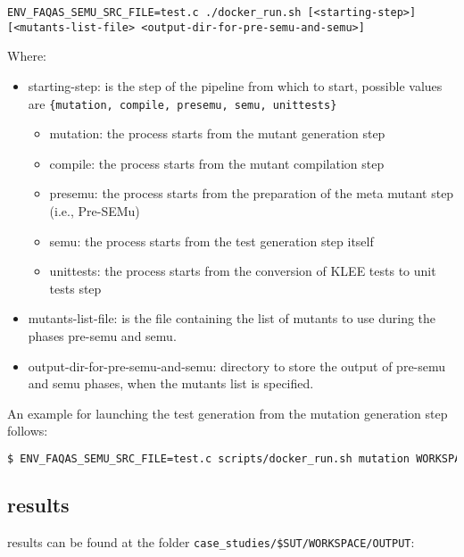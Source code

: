 \begin{lstlisting}[language={}, label=listing:semus_launch]
ENV_FAQAS_SEMU_SRC_FILE=test.c ./docker_run.sh [<starting-step>] [<mutants-list-file> <output-dir-for-pre-semu-and-semu>]
\end{lstlisting}

Where:
\begin{itemize}
	\item starting-step: is the step of the pipeline from which to start, possible values are \texttt{\{mutation, compile, presemu, semu, unittests\}}
	\begin{itemize}
		\item mutation: the process starts from the mutant generation step
		\item compile: the process starts from the mutant compilation step
		\item presemu: the process starts from the preparation of the meta mutant step (i.e., Pre-SEMu)
		\item semu: the process starts from the test generation step itself
		\item unittests: the process starts from the conversion of KLEE tests to unit tests step
	\end{itemize}
	\item mutants-list-file: is the file containing the list of mutants to use during the phases pre-semu and semu.
	\item output-dir-for-pre-semu-and-semu: directory to store the output of pre-semu and semu phases, when the mutants list is specified.
\end{itemize}

An example for launching the test generation from the mutation generation step follows:

\begin{lstlisting}[language=bash]
 $ ENV_FAQAS_SEMU_SRC_FILE=test.c scripts/docker_run.sh mutation WORKSPACE/DOWNLOADED/live_mutants WORKSPACE/OUTPUT/live_mutants_output
\end{lstlisting}

\subsection{\SEMUS results}

\SEMUS results can be found at the folder \texttt{case\_studies/\$SUT/WORKSPACE/OUTPUT}:

